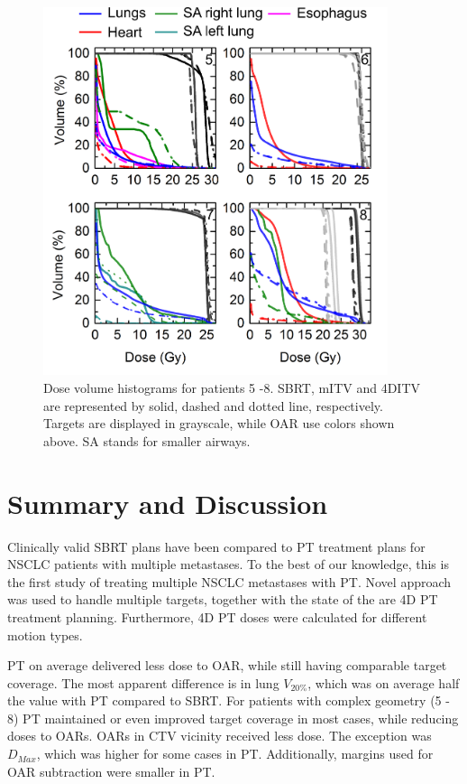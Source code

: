 \newpage
\begin{figure}[H]
	\begin{center}
		\includegraphics[width=0.9\textwidth]{./ComplexPatients/Images/DVH_legend.png}
		\caption{Dose volume histograms for patients 5 -8. SBRT, mITV and 4DITV are represented by solid, dashed and dotted line, respectively. Targets are displayed
		in grayscale, while OAR use colors shown above. SA stands for smaller airways.}
		\label{Fig:dvh}
	\end{center}
\end{figure}
\newpage


\section{Summary and Discussion}

Clinically valid SBRT plans have been compared to PT treatment plans for NSCLC patients with multiple metastases. 
To the best of our knowledge, this is the first study of treating multiple NSCLC metastases with PT. Novel approach was used to handle multiple targets, together
with the state of the are 4D PT treatment planning. Furthermore, 4D PT doses were calculated for different motion types. 

PT on average delivered less dose to OAR, while still having comparable target coverage.
The most apparent difference is in lung $V_{20\%}$, which was on average half the value with PT compared to SBRT.
For patients with complex geometry (5 - 8) PT maintained or even improved target coverage in most cases, while reducing doses to OARs. OARs in CTV vicinity received less dose. The
exception was $D_{Max}$, which was higher for some cases in PT. Additionally, margins used for OAR subtraction were smaller in PT.


